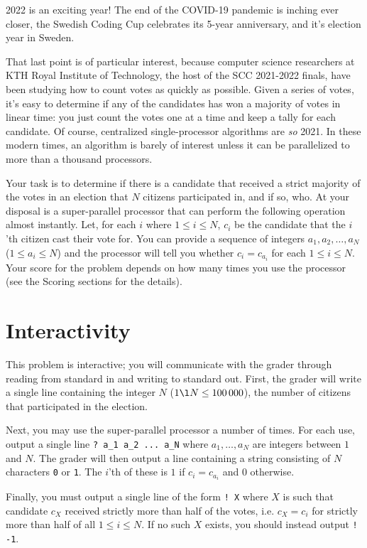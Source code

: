 2022 is an exciting year!
The end of the COVID-19 pandemic is inching ever closer, the Swedish Coding Cup celebrates its 5-year anniversary, and it's election year in Sweden.

That last point is of particular interest, because computer science researchers at KTH Royal Institute of Technology, the host of the SCC 2021-2022 finals, have been studying how to count votes as quickly as possible.
Given a series of votes, it's easy to determine if any of the candidates has won a majority of votes in linear time: you just count the votes one at a time and keep a tally for each candidate.
Of course, centralized single-processor algorithms are \emph{so} 2021.
In these modern times, an algorithm is barely of interest unless it can be parallelized to more than a thousand processors.

Your task is to determine if there is a candidate that received a strict majority of the votes in an election that $N$ citizens participated in, and if so, who.
At your disposal is a super-parallel processor that can perform the following operation almost instantly.
Let, for each $i$ where $1 \le i \le N$, $c_i$ be the candidate that the $i$'th citizen cast their vote for.
You can provide a sequence of integers $a_1, a_2, \dots, a_N$ ($1 \le a_i \le N$) and the processor will tell you whether $c_i = c_{a_i}$ for each $1 \le i \le N$.
Your score for the problem depends on how many times you use the processor (see the Scoring sections for the details).

\section*{Interactivity}
This problem is interactive; you will communicate with the grader through reading from standard in and writing to standard out.
First, the grader will write a single line containing the integer $N$ ($1 \l N \le 100\,000$), the number of citizens that participated in the election.

Next, you may use the super-parallel processor a number of times.
For each use, output a single line \texttt{? a\_1 a\_2 ... a\_N} where $a_1, \dots, a_N$ are integers between $1$ and $N$.
The grader will then output a line containing a string consisting of $N$ characters \texttt{0} or \texttt{1}.
The $i$'th of these is $1$ if $c_i = c_{a_i}$ and $0$ otherwise.

Finally, you must output a single line of the form \texttt{! X} where $X$ is such that candidate $c_X$ received strictly more than half of the votes, i.e. $c_X = c_i$ for strictly more than half of all $1 \le i \le N$.
If no such $X$ exists, you should instead output \texttt{! -1}.

